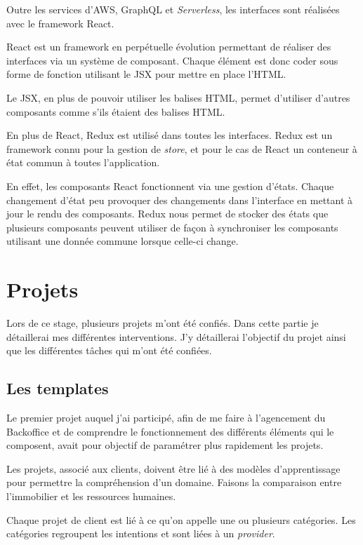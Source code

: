 \documentclass[12pt,a4paper,oneside]{scrreprt}
\begin{document}
Outre les services d'AWS, GraphQL et \textit{Serverless}, les interfaces sont réalisées avec le framework React.

React est un framework en perpétuelle évolution permettant de réaliser des interfaces via un système de composant. Chaque élément est donc coder sous forme de fonction utilisant le JSX pour mettre en place l'HTML.

Le JSX, en plus de pouvoir utiliser les balises HTML, permet d'utiliser d'autres composants comme s'ils étaient des balises HTML.

En plus de React, Redux est utilisé dans toutes les interfaces. Redux est un framework connu pour la gestion de \textit{store}, et pour le cas de React un conteneur à état commun à toutes l'application.

En effet, les composants React fonctionnent via une gestion d'états. Chaque changement d'état peu provoquer des changements dans l'interface en mettant à jour le rendu des composants. Redux nous permet de stocker des états que plusieurs composants peuvent utiliser de façon à synchroniser les composants utilisant une donnée commune lorsque celle-ci change.

\chapter{Projets}

Lors de ce stage, plusieurs projets m'ont été confiés. Dans cette partie je détaillerai mes différentes interventions. J'y détaillerai l'objectif du projet ainsi que les différentes tâches qui m'ont été confiées.

\section{Les templates}

Le premier projet auquel j'ai participé, afin de me faire à l'agencement du Backoffice et de comprendre le fonctionnement des différents éléments qui le composent, avait pour objectif de paramétrer plus rapidement les projets.

Les projets, associé aux clients, doivent être lié à des modèles d'apprentissage pour permettre la compréhension d'un domaine. Faisons la comparaison entre l'immobilier et les ressources humaines.

Chaque projet de client est lié à ce qu'on appelle une ou plusieurs catégories. Les catégories regroupent les intentions et sont liées à un \textit{provider}.
\end{document}
